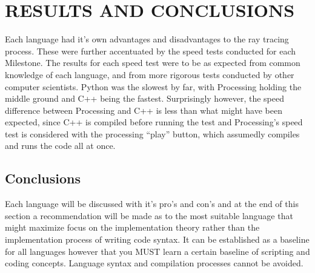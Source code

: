 %
%
%


\chapter{\uppercase{Results and Conclusions}}

Each language had it's own advantages and disadvantages to the ray tracing process.  These were further accentuated by the speed tests conducted for each Milestone.  The results for each speed test were to be as expected from common knowledge of each language, and from more rigorous tests conducted by other computer scientists.  Python was the slowest by far, with Processing holding the middle ground and C++ being the fastest.  Surprisingly however, the speed difference between Processing and C++ is less than what might have been expected, since C++ is compiled before running the test and Processing's speed test is considered with the processing ``play'' button, which assumedly compiles and runs the code all at once.  

\section{Conclusions}
Each language will be discussed with it's pro's and con's and at the end of this section a recommendation will be made as to the most suitable language that might maximize focus on the implementation theory rather than the implementation process of writing code syntax.  It can be established as a baseline for all languages however that you MUST learn a certain baseline of scripting and coding concepts. Language syntax and compilation processes cannot be avoided.  


